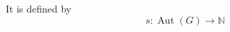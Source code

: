 \documentclass[preview]{standalone}
\begin{document}
It is defined by \[ s : \operatorname{Aut}(G) \to \mathbb{N} \]\\
\end{document}
